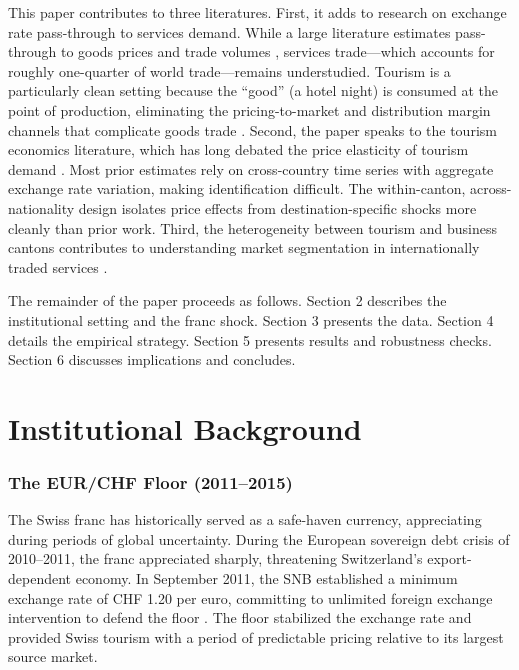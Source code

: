\documentclass[12pt]{article}
\begin{document}
This paper contributes to three literatures. First, it adds to research on exchange rate pass-through to services demand. While a large literature estimates pass-through to goods prices and trade volumes \citep{Gopinath2010,Burstein2019,Amiti2014}, services trade---which accounts for roughly one-quarter of world trade---remains understudied. Tourism is a particularly clean setting because the ``good'' (a hotel night) is consumed at the point of production, eliminating the pricing-to-market and distribution margin channels that complicate goods trade \citep{Auer2019}. Second, the paper speaks to the tourism economics literature, which has long debated the price elasticity of tourism demand \citep{Crouch1996,Peng2015}. Most prior estimates rely on cross-country time series with aggregate exchange rate variation, making identification difficult. The within-canton, across-nationality design isolates price effects from destination-specific shocks more cleanly than prior work. Third, the heterogeneity between tourism and business cantons contributes to understanding market segmentation in internationally traded services \citep{Egger2020}.

The remainder of the paper proceeds as follows. Section 2 describes the institutional setting and the franc shock. Section 3 presents the data. Section 4 details the empirical strategy. Section 5 presents results and robustness checks. Section 6 discusses implications and concludes.

\section{Institutional Background}

\subsubsection*{The EUR/CHF Floor (2011--2015)} The Swiss franc has historically served as a safe-haven currency, appreciating during periods of global uncertainty. During the European sovereign debt crisis of 2010--2011, the franc appreciated sharply, threatening Switzerland's export-dependent economy. In September 2011, the SNB established a minimum exchange rate of CHF 1.20 per euro, committing to unlimited foreign exchange intervention to defend the floor \citep{Auer2015}. The floor stabilized the exchange rate and provided Swiss tourism with a period of predictable pricing relative to its largest source market.
\end{document}
